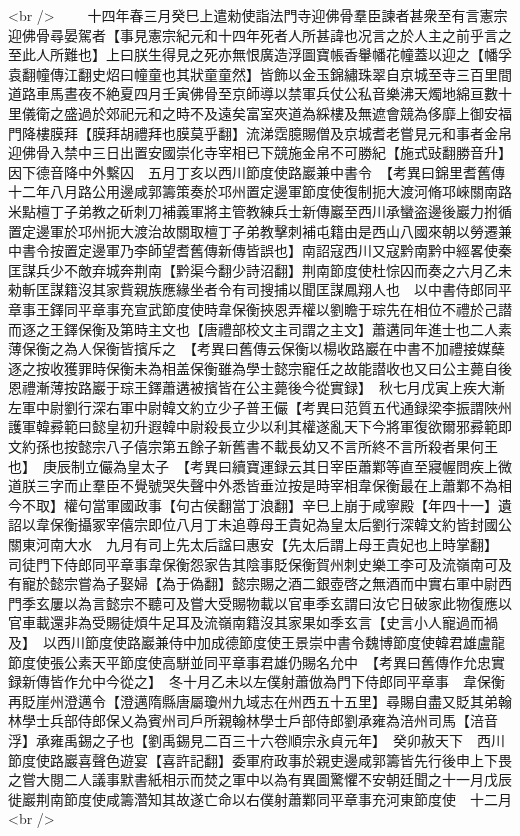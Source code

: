 <br />
　　十四年春三月癸巳上遣勑使詣法門寺迎佛骨羣臣諫者甚衆至有言憲宗迎佛骨尋晏駕者【事見憲宗紀元和十四年死者人所甚諱也况言之於人主之前乎言之至此人所難也】上曰朕生得見之死亦無恨廣造浮圖寶帳香轝幡花幢蓋以迎之【幡孚袁翻幢傳江翻史炤曰幢童也其狀童童然】皆飾以金玉錦繡珠翠自京城至寺三百里間道路車馬晝夜不絶夏四月壬寅佛骨至京師導以禁軍兵仗公私音樂沸天燭地綿亘數十里儀衛之盛過於郊祀元和之時不及遠矣富室夾道為綵樓及無遮會競為侈靡上御安福門降樓膜拜【膜拜胡禮拜也膜莫乎翻】流涕霑臆賜僧及京城耆老嘗見元和事者金帛迎佛骨入禁中三日出置安國崇化寺宰相已下競施金帛不可勝紀【施式䜴翻勝音升】因下德音降中外繫囚　五月丁亥以西川節度使路巖兼中書令　【考異曰錦里耆舊傳十二年八月路公用邊咸郭籌策奏於邛州置定邊軍節度使復制扼大渡河脩邛崍關南路米點檀丁子弟教之斫刺刀補義軍將主管教練兵士新傳巖至西川承蠻盗邊後巖力拊循置定邊軍於邛州扼大渡治故關取檀丁子弟教擊刺補屯籍由是西山八國來朝以勞遷兼中書令按置定邊軍乃李師望耆舊傳新傳皆誤也】南詔寇西川又寇黔南黔中經畧使秦匡謀兵少不敵弃城奔荆南【黔渠今翻少詩沼翻】荆南節度使杜悰囚而奏之六月乙未勑斬匡謀籍沒其家貲親族應緣坐者令有司搜捕以聞匡謀鳳翔人也　以中書侍郎同平章事王鐸同平章事充宣武節度使時韋保衡挾恩弄權以劉瞻于琮先在相位不禮於己譛而逐之王鐸保衡及第時主文也【唐禮部校文主司謂之主文】蕭遘同年進士也二人素薄保衡之為人保衡皆擯斥之　【考異曰舊傳云保衡以楊收路巖在中書不加禮接媒蘖逐之按收獲罪時保衡未為相盖保衡雖為學士懿宗寵任之故能譛收也又曰公主薨自後恩禮漸薄按路巖于琮王鐸蕭遘被擯皆在公主薨後今從實録】　秋七月戊寅上疾大漸左軍中尉劉行深右軍中尉韓文約立少子普王儼【考異曰范質五代通録梁李振謂陜州護軍韓彛範曰懿皇初升遐韓中尉殺長立少以利其權遂亂天下今將軍復欲爾邪彛範即文約孫也按懿宗八子僖宗第五餘子新舊書不載長幼又不言所終不言所殺者果何王也】　庚辰制立儼為皇太子　【考異曰續寶運録云其日宰臣蕭鄴等直至寢幄問疾上微道朕三字而止羣臣不覺號哭失聲中外悉皆垂泣按是時宰相韋保衡最在上蕭鄴不為相今不取】權句當軍國政事【句古侯翻當丁浪翻】辛巳上崩于咸寧殿【年四十一】遺詔以韋保衡攝冢宰僖宗即位八月丁未追尊母王貴妃為皇太后劉行深韓文約皆封國公　關東河南大水　九月有司上先太后諡曰惠安【先太后謂上母王貴妃也上時掌翻】　司徒門下侍郎同平章事韋保衡怨家告其陰事貶保衡賀州刺史樂工李可及流嶺南可及有寵於懿宗嘗為子娶婦【為于偽翻】懿宗賜之酒二銀壺啓之無酒而中實右軍中尉西門季玄屢以為言懿宗不聽可及嘗大受賜物載以官車季玄謂曰汝它日破家此物復應以官車載還非為受賜徒煩牛足耳及流嶺南籍沒其家果如季玄言【史言小人寵過而禍及】　以西川節度使路巖兼侍中加成德節度使王景崇中書令魏博節度使韓君雄盧龍節度使張公素天平節度使高駢並同平章事君雄仍賜名允中　【考異曰舊傳作允忠實録新傳皆作允中今從之】　冬十月乙未以左僕射蕭倣為門下侍郎同平章事　韋保衡再貶崖州澄邁令【澄邁隋縣唐屬瓊州九域志在州西五十五里】尋賜自盡又貶其弟翰林學士兵部侍郎保乂為賓州司戶所親翰林學士戶部侍郎劉承雍為涪州司馬【涪音浮】承雍禹錫之子也【劉禹錫見二百三十六卷順宗永貞元年】　癸卯赦天下　西川節度使路巖喜聲色遊宴【喜許記翻】委軍府政事於親吏邊咸郭籌皆先行後申上下畏之嘗大閱二人議事默書紙相示而焚之軍中以為有異圖驚懼不安朝廷聞之十一月戊辰徙巖荆南節度使咸籌濳知其故遂亡命以右僕射蕭鄴同平章事充河東節度使　十二月<br />
